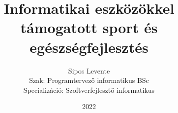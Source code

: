 \documentclass[tocnopagenum]{thesis-ekf}
\theoremstyle{definition}
\theoremstyle{remark}
\begin{document}
	\title{Informatikai eszközökkel támogatott sport és egészségfejlesztés}
	\author{Sipos Levente\\Szak: Programtervező informatikus BSc\\Specializáció: Szoftverfejlesztő informatikus}
	\date{2022}
	\begin{titlepage}
		\maketitle
	\end{titlepage}	
	\tableofcontents

\end{document}
